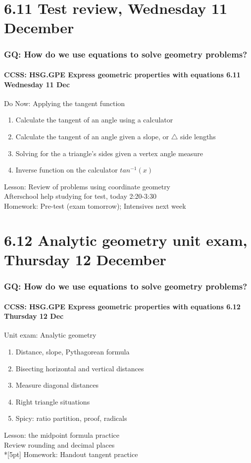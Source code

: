 \documentclass{beamer}
\begin{document}
\section{6.11 Test review, Wednesday 11 December}
\frame
{
  \frametitle{GQ: How do we use equations to solve geometry problems?}
  \framesubtitle{CCSS: HSG.GPE Express geometric properties with equations \hfill \alert{6.11 Wednesday 11 Dec}}

  \begin{block}{Do Now: Applying the tangent function}
  \begin{enumerate}
    \item Calculate the tangent of an angle using a calculator
    \item Calculate the tangent of an angle given a slope, or $\triangle$ side lengths
    \item Solving for the a triangle's sides given a vertex angle measure
    \item Inverse function on the calculator $tan^{-1}(x)$
  \end{enumerate}
  \end{block}
  Lesson: Review of problems using coordinate geometry \\
  Afterschool help studying for test, today 2:20-3:30\\[0.25cm]
  Homework: Pre-test (\alert{exam tomorrow}); Intensives next week
}

\section{6.12 Analytic geometry unit exam, Thursday 12 December}
\frame
{
  \frametitle{GQ: How do we use equations to solve geometry problems?}
  \framesubtitle{CCSS: HSG.GPE Express geometric properties with equations \hfill \alert{6.12 Thursday 12 Dec}}

  \begin{block}{Unit exam: Analytic geometry}
  \begin{enumerate}
    \item Distance, slope, Pythagorean formula
    \item Bisecting horizontal and vertical distances
    \item Measure diagonal distances
    \item Right triangle situations
    \item Spicy: ratio partition, proof, radicals
  \end{enumerate}
  \end{block}
  Lesson: the midpoint formula practice\\
  Review rounding and decimal places \\*[5pt]
  Homework: Handout tangent practice
}
\end{document}
